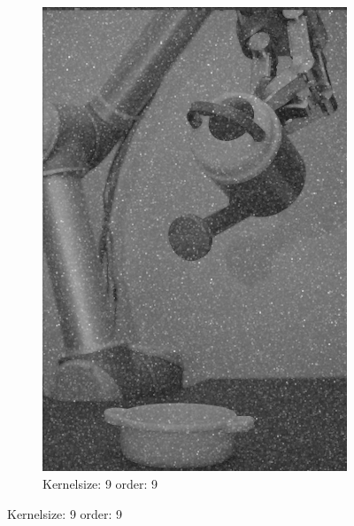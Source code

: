 \begin{figure}[H]
\begin{subfigure}[b]{0.3\textwidth}
        \includegraphics[width=\textwidth]{img1/img_1_gaus_9_9.png}
        \caption{Kernelsize: 9 order: 9}
         \label{fig:img1_contra9_9}
    \end{subfigure}
    
    
    
    
    

\end{figure}
